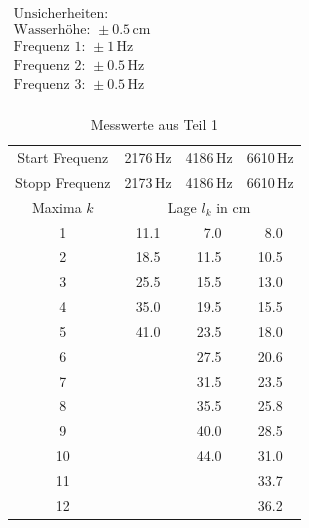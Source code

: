\documentclass[11pt,a4paper]{article}
\begin{document}
\begin{table}[h]
	\centering
	\caption{Messwerte aus Teil 1} \vspace{11pt}
	$\begin{array}{l}
		\textrm{Unsicherheiten:}\\
		\textrm{Wasserhöhe: } \pm 0.5\, \textrm{cm}\\
		\textrm{Frequenz 1: } \pm 1\, \textrm{Hz}\\
		\textrm{Frequenz 2: } \pm 0.5\, \textrm{Hz}\\
		\textrm{Frequenz 3: } \pm 0.5\, \textrm{Hz}\\
	\end{array}$
	\begin{tabular}{cccc}
		\toprule
		\textrm{Start Frequenz} & 2176\,\textrm{Hz} & 4186\,\textrm{Hz} & 6610\,\textrm{Hz} \\
		\textrm{Stopp Frequenz} & 2173\,\textrm{Hz} & 4186\,\textrm{Hz} & 6610\,\textrm{Hz} \\
		\midrule 
		\textrm{Maxima $k$} & \multicolumn{3}{c}{\textrm{Lage $l_k$ in cm}} \\ 
		\midrule 
		1 & 11.1 &\ 7.0 &\ 8.0 \\
		2 & 18.5 & 11.5 & 10.5 \\
		3 & 25.5 & 15.5 & 13.0 \\
		4 & 35.0 & 19.5 & 15.5 \\
		5 & 41.0 & 23.5 & 18.0 \\ 
		6 & 	 & 27.5 & 20.6 \\ 
		7 & 	 & 31.5 & 23.5 \\
		8 &		 & 35.5 & 25.8 \\
		9 & 	 & 40.0 & 28.5 \\
		10&		 & 44.0 & 31.0 \\
		11& 	 &		& 33.7 \\
		12& 	 &		& 36.2 \\
		\bottomrule
	\end{tabular}
	\label{Tab:1}
\end{table}
\end{document}
